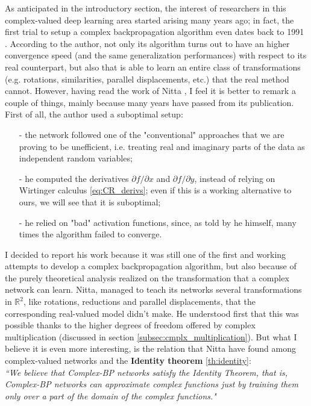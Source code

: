 \documentclass[../main.tex]{subfiles}
\begin{document}
As anticipated in the introductory section, the interest of researchers in this complex-valued deep learning area started arising many years ago; in fact, the first trial to setup a complex backpropagation algorithm even dates back to 1991 \cite{Nitta_complexBP}. According to the author, not only its algorithm turns out to have an higher convergence speed (and the same generalization performances) with respect to its real counterpart, but also that is able to learn an entire class of transformations (e.g. rotations, similarities, parallel displacements, etc.) that the real method cannot. However, having read the work of Nitta \cite{Nitta_complexBP}, I feel it is better to remark a couple of things, mainly because many years have passed from its publication. First of all, the author used a suboptimal setup:
\begin{itemize}
	\item[-] the network followed one of the "conventional" approaches that we are proving to be unefficient, i.e. treating real and imaginary parts of the data as independent random variables;
	\item[-] he computed the derivatives $\partial f/\partial x$ and $\partial f/\partial y$, instead of relying on Wirtinger calculus \ref{eq:CR_derivs}; even if this is a working alternative to ours, we will see that it is suboptimal;
	\item[-] he relied on "bad" activation functions, since, as told by he himself, many times the algorithm failed to converge.
\end{itemize}
I decided to report his work because it was still one of the first and working attempts to develop a complex backpropagation algorithm, but also because of the purely theoretical analysis realized on the transformation that a complex network can learn. Nitta, managed to teach its networks several transformations in $\mathds{R}^2$, like rotations, reductions and parallel displacements, that the corresponding real-valued model didn't	make. He understood first that this was possible thanks to the higher degrees of freedom offered by complex multiplication (discussed in section \ref{subsec:cmplx_multiplication}). But what I believe it is even more interesting, is the relation that Nitta have found among complex-valued networks and the \textbf{Identity theorem} \ref{th:identity}:\\ 
\textit{``We believe
that Complex-BP networks satisfy the Identity Theorem, that is, Complex-BP networks can approximate complex
functions just by training them only over a part of the
domain of the complex functions."}\\
\end{document}
